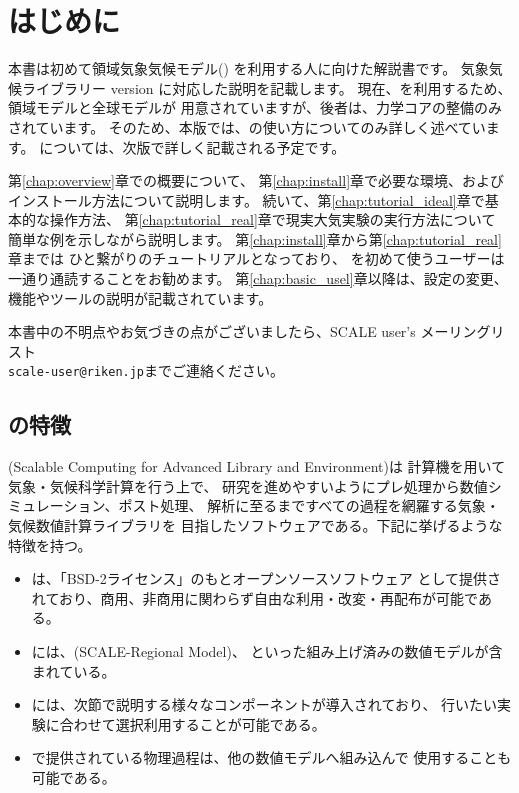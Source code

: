 \section{はじめに} \label{sec:introduction}

本書は初めて領域気象気候モデル({\scalerm})
を利用する人に向けた解説書です。
気象気候ライブラリー{\scalelib}  version \version に対応した説明を記載します。
現在、\scalelib を利用するため、領域モデル\scalerm と全球モデル\scalegm が
用意されていますが、後者は、力学コアの整備のみされています。
そのため、本版では、\scalerm の使い方についてのみ詳しく述べています。
\scalegm については、次版で詳しく記載される予定です。

第\ref{chap:overview}章で\scalelib の概要について、
第\ref{chap:install}章で必要な環境、およびインストール方法について説明します。
続いて、第\ref{chap:tutorial_ideal}章で基本的な操作方法、
第\ref{chap:tutorial_real}章で現実大気実験の実行方法について
簡単な例を示しながら説明します。
第\ref{chap:install}章から第\ref{chap:tutorial_real}章までは
ひと繋がりのチュートリアルとなっており、
\scalerm を初めて使うユーザーは一通り通読することをお勧めます。
第\ref{chap:basic_usel}章以降は、設定の変更、機能やツールの説明が記載されています。

本書中の不明点やお気づきの点がございましたら、SCALE user's メーリングリスト\\
 \verb|scale-user@riken.jp|までご連絡ください。



\subsection{\scalelib の特徴} \label{subsec:scale_feature}

{\scalelib} (Scalable Computing for Advanced Library and Environment)は
計算機を用いて気象・気候科学計算を行う上で、
研究を進めやすいようにプレ処理から数値シミュレーション、ポスト処理、
解析に至るまですべての過程を網羅する気象・気候数値計算ライブラリを
目指したソフトウェアである。下記に挙げるような特徴を持つ。
\begin{itemize}
\item \scalelib は、「BSD-2ライセンス」のもとオープンソースソフトウェア
として提供されており、商用、非商用に関わらず自由な利用・改変・再配布が可能である。
\item \scalelib には、\scalerm (SCALE-Regional Model)、
といった組み上げ済みの数値モデルが含まれている。
\item \scalelib には、次節で説明する様々なコンポーネントが導入されており、
行いたい実験に合わせて選択利用することが可能である。
\item \scalelib で提供されている物理過程は、他の数値モデルへ組み込んで
使用することも可能である。
\end{itemize}

